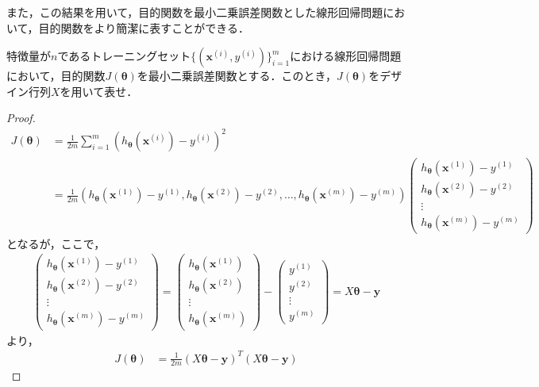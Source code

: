 また，この結果を用いて，目的関数を最小二乗誤差関数とした線形回帰問題において，目的関数をより簡潔に表すことができる．

\begin{qu}
特徴量が$n$であるトレーニングセット$\{({\bm x}^{(i)},y^{(i)})\}_{i=1}^m$における線形回帰問題において，目的関数$J({\bm \theta})$を最小二乗誤差関数とする．このとき，$J({\bm \theta})$をデザイン行列$X$を用いて表せ．
\end{qu}
\begin{proof}
\begin{align}
J({\bm \theta})&= \frac{1}{2m}\sum_{i=1}^m (h_{{\bm \theta}}({\bm x}^{(i)})-y^{(i)})^2 \nonumber \\
&=\frac{1}{2m}\left(h_{{\bm \theta}}({\bm x}^{(1)})-y^{(1)},h_{{\bm \theta}}({\bm x}^{(2)})-y^{(2)},\ldots,h_{{\bm \theta}}({\bm x}^{(m)})-y^{(m)}\right)
\left(
\begin{array}{c}
h_{{\bm \theta}}({\bm x}^{(1)})-y^{(1)} \\
h_{{\bm \theta}}({\bm x}^{(2)})-y^{(2)} \\
\vdots \\
h_{{\bm \theta}}({\bm x}^{(m)})-y^{(m)}
\end{array}
\right) \nonumber
\end{align}
となるが，ここで，
\begin{align}
\left(
\begin{array}{c}
h_{{\bm \theta}}({\bm x}^{(1)})-y^{(1)} \\
h_{{\bm \theta}}({\bm x}^{(2)})-y^{(2)} \\
\vdots \\
h_{{\bm \theta}}({\bm x}^{(m)})-y^{(m)}
\end{array}
\right)
=
\left(
\begin{array}{c}
h_{{\bm \theta}}({\bm x}^{(1)}) \\
h_{{\bm \theta}}({\bm x}^{(2)}) \\
\vdots \\
h_{{\bm \theta}}({\bm x}^{(m)})
\end{array}
\right)
-
\left(
\begin{array}{c}
y^{(1)} \\
y^{(2)} \\
\vdots \\
y^{(m)}
\end{array}
\right)
=X{\bm \theta}-{\bm y} \nonumber
\end{align}
より，
\begin{align}
J({\bm \theta})&= \frac{1}{2m}(X{\bm \theta}-{\bm y})^T(X{\bm \theta}-{\bm y})
\end{align}
\end{proof}

